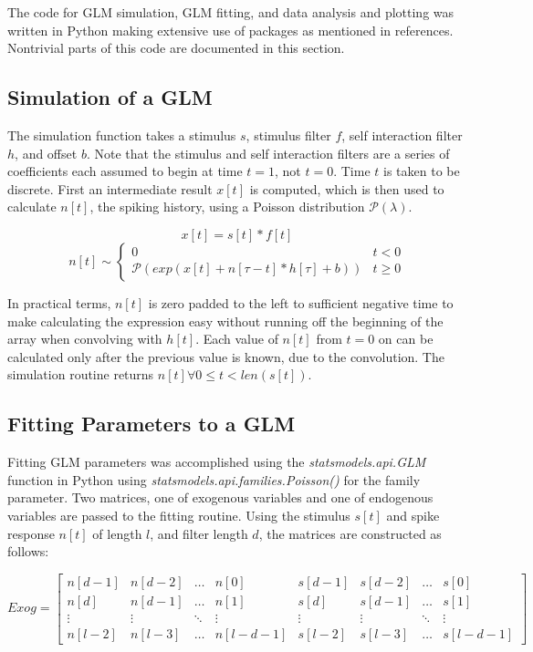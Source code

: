 \documentclass[letterpaper,titlepage,10pt]{article}
\begin{document}
The code for GLM simulation, GLM fitting, and data analysis and plotting was written in Python making extensive use
of packages as mentioned in references. Nontrivial parts of this code are documented in this section.

\subsection{Simulation of a GLM}

The simulation function takes a stimulus $s$, stimulus filter $f$, self interaction filter $h$, and offset $b$. Note
that the stimulus and self interaction filters are a series of coefficients each assumed to begin at time $t=1$, not
$t=0$. Time $t$ is taken to be discrete. First an intermediate result $x[t]$ is computed, which is then used to
calculate $n[t]$, the spiking history, using a Poisson distribution $\mathcal{P}(\lambda)$.

$$x[t]=s[t]*f[t]$$
$$n[t]\sim
\begin{cases}
0 & t < 0\\
\mathcal{P}(exp(x[t]+n[\tau-t]*h[\tau]+b)) & t \geq 0
\end{cases}$$

In practical terms, $n[t]$ is zero padded to the left to sufficient negative time to make calculating the expression
easy without running off the beginning of the array when convolving with $h[t]$. Each value of $n[t]$ from $t=0$ on
can be calculated only after the previous value is known, due to the convolution. The simulation routine returns
$n[t] \forall 0 \leq t < len(s[t])$.

\subsection{Fitting Parameters to a GLM}

Fitting GLM parameters was accomplished using the \textit{statsmodels.api.GLM} function in
Python using \textit{statsmodels.api.families.Poisson()} for the family parameter. Two
matrices, one of exogenous variables and one of endogenous variables are passed to the fitting routine. Using the
stimulus $s[t]$ and spike response $n[t]$ of length $l$, and filter length $d$, the matrices are constructed as
follows:

$$Exog=
\begin{bmatrix}
n[d-1] & n[d-2] & \hdots & n[0] & s[d-1] & s[d-2] & \hdots & s[0] \\
n[d] & n[d-1] & \hdots & n[1] & s[d] & s[d-1] & \hdots & s[1] \\
\vdots & \vdots & \ddots & \vdots & \vdots & \vdots & \ddots & \vdots \\
n[l-2] & n[l-3] & \hdots & n[l-d-1] & s[l-2] & s[l-3] & \hdots & s[l-d-1]
\end{bmatrix}$$
\end{document}
